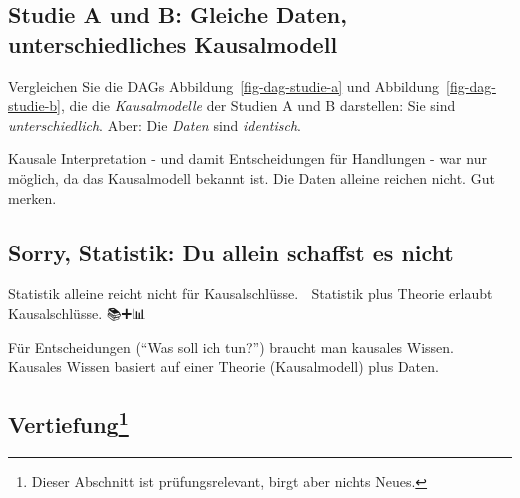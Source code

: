 \documentclass[
  a4paper,
  DIV=11]{scrreprt}
\theoremstyle{definition}
\theoremstyle{remark}
\begin{document}
\hypertarget{studie-a-und-b-gleiche-daten-unterschiedliches-kausalmodell}{%
\subsection{Studie A und B: Gleiche Daten, unterschiedliches
Kausalmodell}\label{studie-a-und-b-gleiche-daten-unterschiedliches-kausalmodell}}

Vergleichen Sie die DAGs Abbildung~\ref{fig-dag-studie-a} und
Abbildung~\ref{fig-dag-studie-b}, die die \emph{Kausalmodelle} der
Studien A und B darstellen: Sie sind \emph{unterschiedlich}. Aber: Die
\emph{Daten} sind \emph{identisch}.

Kausale Interpretation - und damit Entscheidungen für Handlungen - war
nur möglich, da das Kausalmodell bekannt ist. Die Daten alleine reichen
nicht. Gut merken.

\hypertarget{sorry-statistik-du-allein-schaffst-es-nicht}{%
\subsection{Sorry, Statistik: Du allein schaffst es
nicht}\label{sorry-statistik-du-allein-schaffst-es-nicht}}

Statistik alleine reicht nicht für Kausalschlüsse. 🧟 Statistik plus
Theorie erlaubt Kausalschlüsse. 📚➕📊 🟰 🤩

\begin{tcolorbox}[enhanced jigsaw, title=\textcolor{quarto-callout-important-color}{\faExclamation}\hspace{0.5em}{Wichtig}, bottomtitle=1mm, bottomrule=.15mm, titlerule=0mm, colbacktitle=quarto-callout-important-color!10!white, colframe=quarto-callout-important-color-frame, leftrule=.75mm, left=2mm, toprule=.15mm, colback=white, arc=.35mm, breakable, toptitle=1mm, opacityback=0, rightrule=.15mm, coltitle=black, opacitybacktitle=0.6]

Für Entscheidungen (``Was soll ich tun?'') braucht man kausales Wissen.
Kausales Wissen basiert auf einer Theorie (Kausalmodell) plus Daten.

\end{tcolorbox}

\hypertarget{vertiefung-3}{%
\subsection[Vertiefung]{\texorpdfstring{Vertiefung\footnote{Dieser
  Abschnitt ist prüfungsrelevant, birgt aber nichts Neues.}}{Vertiefung}}\label{vertiefung-3}}
\end{document}
